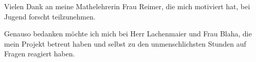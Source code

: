 Vielen Dank an meine Mathelehrerin Frau Reimer, die mich motiviert hat, bei Jugend forscht teilzunehmen.

\vspace{5mm}

\noindent
Genauso bedanken möchte ich mich bei Herr Lachenmaier und Frau Blaha, die mein Projekt betreut haben und selbst zu den unmenschlichsten Stunden auf Fragen reagiert haben.